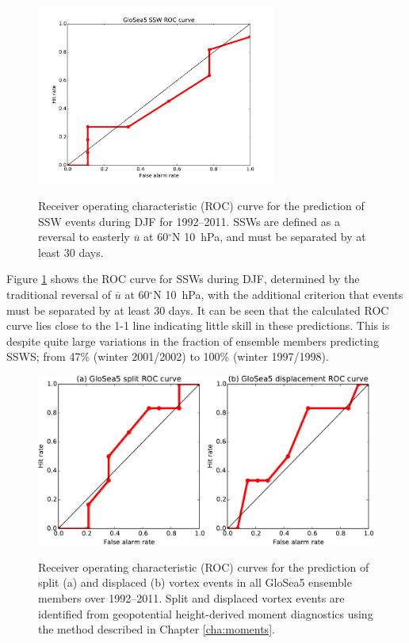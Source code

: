 \begin{figure}[t] \centering
  \noindent\includegraphics[width=0.7\textwidth,angle=0]{figures/chapter-seasonal/SSW_ROC.pdf}\\
  \caption[ROC curve for the prediction of SSWs.]{Receiver operating
    characteristic (ROC) curve for the prediction of SSW events during DJF for
    1992--2011. SSWs are defined as a reversal to easterly $\overline{u}$ at
    60$^{\circ}$N 10~hPa, and must be separated by at least 30
    days.}\label{fig:ssw_roc}
\end{figure}

Figure \ref{fig:ssw_roc} shows the ROC curve for SSWs during DJF, determined by
the traditional reversal of $\overline{u}$ at 60$^\circ$N 10~hPa, with the
additional criterion that events must be separated by at least 30 days. It can
be seen that the calculated ROC curve lies close to the 1-1 line indicating
little skill in these predictions. This is despite quite large variations in the
fraction of ensemble members predicting SSWS; from 47\% (winter 2001/2002) to
100\% (winter 1997/1998). 

\begin{figure}[t] \centering
  \noindent\includegraphics[width=\textwidth,angle=0]{figures/chapter-seasonal/glosea_split_displ_ROC_any.pdf}\\
  \caption[ROC curves for the prediction of split and displaced vortex
  events.]{Receiver operating characteristic (ROC) curves for the prediction of
    split (a) and displaced (b) vortex events in all GloSea5 ensemble members
    over 1992--2011. Split and displaced vortex events are identified from
    geopotential height-derived moment diagnostics using the method described in
    Chapter \ref{cha:moments}.}\label{fig:split_displ_roc}
\end{figure}

